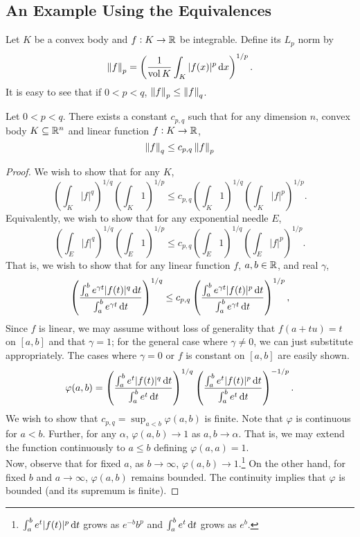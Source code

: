 \documentclass{article}
\begin{document}
	\subsection{An Example Using the Equivalences}

		Let $K$ be a convex body and $f:K\to\mathbb{R}$ be integrable. Define its $L_p$ norm by
		\[ \left\lVert f\right\rVert_p = \left(\frac{1}{\operatorname{vol} K} \int_{K} |f(x)|^p \operatorname{d}\!{x} \right)^{1/p}. \]
		It is easy to see that if $0<p<q$, $\left\lVert f\right\rVert_p \leq \left\lVert f\right\rVert_q$.
		\begin{theorem}
			Let $0<p<q$. There exists a constant $c_{p,q}$ such that for any dimension $n$, convex body $K\subseteq\mathbb{R}^n$ and linear function $f:K\to\mathbb{R}$,
			\[ \left\lVert f\right\rVert_q \leq c_{p,q}\left\lVert f\right\rVert_p \]
		\end{theorem}
		\begin{proof}
			We wish to show that for any $K$,
			\[ \left(\int_K |f|^q\right)^{1/q} \left(\int_K 1\right)^{1/p} \leq c_{p,q} \left(\int_K 1\right)^{1/q} \left(\int_K |f|^p\right)^{1/p}. \]
			Equivalently, we wish to show that for any exponential needle $E$,
			\[ \left(\int_E |f|^q\right)^{1/q} \left(\int_E 1\right)^{1/p} \leq c_{p,q} \left(\int_E 1\right)^{1/q} \left(\int_E |f|^p\right)^{1/p}. \]
			That is, we wish to show that for any linear function $f$, $a,b\in\mathbb{R}$, and real $\gamma$,
			\[ \left( \frac{\int_a^b e^{\gamma t} |f(t)|^q\operatorname{d}\!{t}}{\int_a^b e^{\gamma t}\operatorname{d}\!{t}} \right)^{1/q} \leq c_{p,q} \left( \frac{\int_a^b e^{\gamma t} |f(t)|^p\operatorname{d}\!{t}}{\int_a^b e^{\gamma t}\operatorname{d}\!{t}}\right)^{1/p}, \]
			Since $f$ is linear, we may assume without loss of generality that $f(a+tu)=t$ on $[a,b]$ and that $\gamma=1$; for the general case where $\gamma\neq 0$, we can just substitute appropriately. The cases where $\gamma=0$ or $f$ is constant on $[a,b]$ are easily shown.\\
			\[ \varphi(a,b) = \left( \frac{\int_a^b e^{t} |f(t)|^q\operatorname{d}\!{t}}{\int_a^b e^{t}\operatorname{d}\!{t}} \right)^{1/q} \left( \frac{\int_a^b e^{t} |f(t)|^p\operatorname{d}\!{t}}{\int_a^b e^{t}\operatorname{d}\!{t}} \right)^{-1/p}. \]
			We wish to show that $c_{p,q} = \sup_{a<b} \varphi(a,b)$ is finite. Note that $\varphi$ is continuous for $a<b$. Further, for any $\alpha$, $\varphi(a,b)\to 1$ as $a,b\to\alpha$. That is, we may extend the function continuously to $a\leq b$ defining $\varphi(a,a)=1$.\\
			Now, observe that for fixed $a$, as $b\to\infty$, $\varphi(a,b)\to 1$.\footnote{$\int_a^b e^t |f(t)|^p\operatorname{d}\!{t}$ grows as $e^{-b}b^p$ and $\int_a^b e^t\operatorname{d}\!{t}$ grows as $e^b$.} On the other hand, for fixed $b$ and $a\to\infty$, $\varphi(a,b)$ remains bounded. The continuity implies that $\varphi$ is bounded (and its supremum is finite).
		\end{proof}
\end{document}
